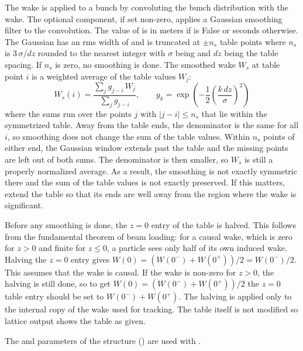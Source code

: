 The wake is applied to a bunch by convoluting the bunch distribution with the wake.  The optional
 component, if set non-zero, applies a Gaussian smoothing filter to the
convolution. The value of  is in meters if  is False or seconds
otherwise. The Gaussian has an rms width of  and is truncated at $\pm
n_s$ table points where $n_s$ is $3 \, \sigma / dz$ rounded to the nearest integer with $\sigma$
being  and $dz$ being the table
spacing. If $n_s$ is zero, no smoothing is done. The smoothed wake $W_s$ at table point $i$ is a
weighted average of the table values $W_j$:
\begin{equation}
  W_s(i) = \frac{\sum_j g_{j-i} \, W_j}{\sum_j g_{j-i}}, \qquad
  g_k = \exp\left( -\frac{1}{2} \left( \frac{k \, dz}{\sigma} \right)^2 \right)
\end{equation}
where the sums run over the points $j$ with $|j - i| \le n_s$ that lie within the symmetrized
table. Away from the table ends, the denominator is the same for all $i$, so smoothing does not
change the sum of the table values. Within $n_s$ points of either end, the Gaussian window extends past
the table and the missing points are left out of both sums. The denominator is then smaller, so
$W_s$ is still a properly normalized average. As a result, the smoothing is not exactly
symmetric there and the sum of the table values is not exactly preserved. If this matters, extend the table
so that its ends are well away from the region where the wake is significant.

Before any smoothing is done, the $z = 0$ entry of the table is halved. This follows from the
fundamental theorem of beam loading: for a causal wake, which is zero for $z > 0$ and finite for $z
\le 0$, a particle sees only half of its own induced wake. Halving the $z = 0$ entry gives
$W(0) = (W(0^-) + W(0^+))/2 = W(0^-)/2$. This assumes that the wake is causal. If the wake
is non-zero for $z > 0$, the halving is still done, so to get $W(0) = (W(0^-) + W(0^+))/2$ the
$z = 0$ table entry should be set to $W(0^-) + W(0^+)$. The halving is applied only to the
internal copy of the wake used for tracking. The  table itself is not modified so lattice
output shows the table as given.

The  and  parameters of the  structure ()
are used with .

